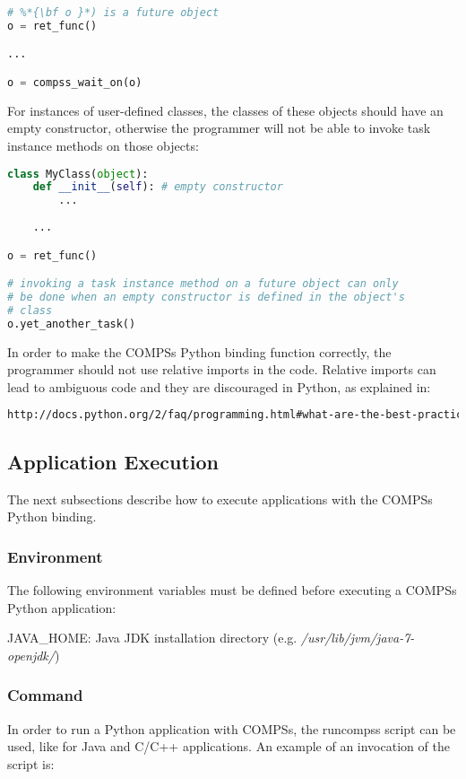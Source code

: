 \begin{lstlisting}[language=python]
# %*{\bf o }*) is a future object
o = ret_func()

...

o = compss_wait_on(o)
\end{lstlisting}
                         

For instances of user-defined classes, the classes of these objects 
should have an empty constructor, otherwise the programmer will not be able to invoke task instance 
methods on those objects:
                                   
\begin{lstlisting}[language=python]
class MyClass(object):
    def __init__(self): # empty constructor
        ...
        
    ...

o = ret_func()

# invoking a task instance method on a future object can only
# be done when an empty constructor is defined in the object's
# class
o.yet_another_task()
\end{lstlisting}

In order to make the COMPSs Python binding function correctly, the programmer should not use relative imports 
in the code. Relative imports can lead to ambiguous code and they are discouraged in Python, as explained in:

\begin{lstlisting}[language=html]
http://docs.python.org/2/faq/programming.html#what-are-the-best-practices-for-using-import-in-a-module
\end{lstlisting}


\subsection{Application Execution}
The next subsections describe how to execute applications with the COMPSs Python binding.

\subsubsection{Environment}
The following environment variables must be defined before executing a COMPSs Python application:

JAVA\_HOME: Java JDK installation directory (e.g. \textit{/usr/lib/jvm/java-7-openjdk/})

\subsubsection{Command}
In order to run a Python application with COMPSs, the runcompss script can be used, like for 
Java and C/C++ applications. An example of an invocation of the script is:

